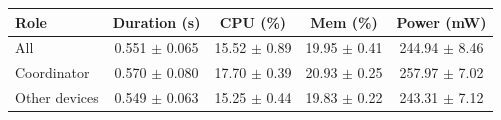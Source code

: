 \begin{tabular}{lcccc}
\hline
\textbf{Role} & \textbf{Duration (s)} & \textbf{CPU (\%)} & \textbf{Mem (\%)} & \textbf{Power (mW)} \\
\hline
All & 0.551 $\pm$ 0.065 & 15.52 $\pm$ 0.89 & 19.95 $\pm$ 0.41 & 244.94 $\pm$ 8.46 \\
Coordinator & 0.570 $\pm$ 0.080 & 17.70 $\pm$ 0.39 & 20.93 $\pm$ 0.25 & 257.97 $\pm$ 7.02 \\
Other devices & 0.549 $\pm$ 0.063 & 15.25 $\pm$ 0.44 & 19.83 $\pm$ 0.22 & 243.31 $\pm$ 7.12 \\
\hline
\end{tabular}
